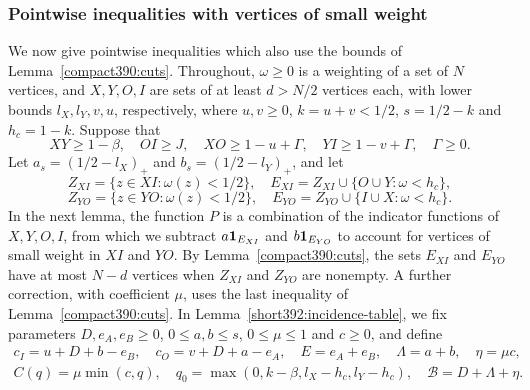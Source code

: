 \subsubsection{Pointwise inequalities with vertices of small weight}
We now give pointwise inequalities which also use the bounds of Lemma~\ref{compact390:cuts}. Throughout, $\omega\ge0$ is a weighting of a set of $N$ vertices, and $X,Y,O,I$ are sets of at least $d>N/2$ vertices each, with lower bounds
$l_X,l_Y,v,u$, respectively, where $u,v\ge0$, $k=u+v<1/2$,
$s=1/2-k$ and $h_c=1-k$. Suppose that
\[
 XY\ge1-\beta,\quad OI\ge J,\quad
 XO\ge1-u+\Gamma,\quad YI\ge1-v+\Gamma,\quad \Gamma\ge0.
\]
Let $a_s=(1/2-l_X)_+$ and $b_s=(1/2-l_Y)_+$, and let
\[
 Z_{XI}=\{z\in XI:\omega(z)<1/2\},\quad E_{XI}=Z_{XI}\cup\{O\cup Y:\omega<h_c\},
\]
\[
 Z_{YO}=\{z\in YO:\omega(z)<1/2\},\quad E_{YO}=Z_{YO}\cup\{I\cup X:\omega<h_c\}.
\]
In the next lemma, the function $P$ is a combination of the indicator functions of $X,Y,O,I$, from which we subtract $a\mathbf 1_{E_{XI}}$ and $b\mathbf 1_{E_{YO}}$ to account for vertices of small weight in $XI$ and $YO$. By Lemma~\ref{compact390:cuts}, the sets $E_{XI}$ and $E_{YO}$ have at most $N-d$ vertices when $Z_{XI}$ and $Z_{YO}$ are nonempty. A further correction, with coefficient $\mu$, uses the last inequality of Lemma~\ref{compact390:cuts}.
In Lemma~\ref{short392:incidence-table}, we fix parameters $D,e_A,e_B\ge0$, $0\le a,b\le s$, $0\le\mu\le1$ and $c\ge0$, and define
\[
\begin{gathered}
 c_I=u+D+b-e_B,\quad c_O=v+D+a-e_A,\quad
 E=e_A+e_B,\quad \Lambda=a+b,\quad \eta=\mu c,\\
 C(q)=\mu\min(c,q),\quad
 q_0=\max(0,k-\beta,l_X-h_c,l_Y-h_c),\quad
 \mathcal B=D+\Lambda+\eta.
\end{gathered}
\]


